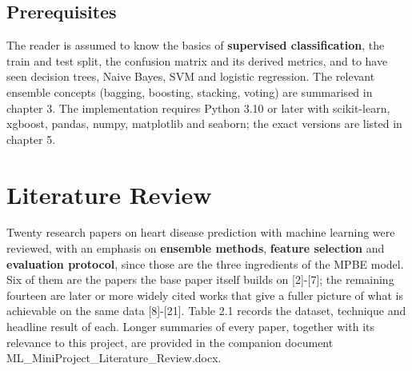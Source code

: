 \documentclass[12pt,a4paper,oneside]{report}
\begin{document}
\section{Prerequisites}
The reader is assumed to know the basics of \textbf{supervised classification}, the train and test split, the confusion matrix and its derived metrics, and to have seen decision trees, Naive Bayes, SVM and logistic regression. The relevant ensemble concepts (bagging, boosting, stacking, voting) are summarised in chapter 3. The implementation requires Python 3.10 or later with scikit-learn, xgboost, pandas, numpy, matplotlib and seaborn; the exact versions are listed in chapter 5.

\chapter{Literature Review}
Twenty research papers on heart disease prediction with machine learning were reviewed, with an emphasis on \textbf{ensemble methods}, \textbf{feature selection} and \textbf{evaluation protocol}, since those are the three ingredients of the MPBE model. Six of them are the papers the base paper itself builds on [2]-[7]; the remaining fourteen are later or more widely cited works that give a fuller picture of what is achievable on the same data [8]-[21]. Table 2.1 records the dataset, technique and headline result of each. Longer summaries of every paper, together with its relevance to this project, are provided in the companion document ML\_MiniProject\_Literature\_Review.docx.
\end{document}
